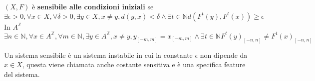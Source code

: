 \begin{definizione} 
    $(X,F)$ è \textbf{sensibile alle condizioni iniziali} se
    $$\exists \epsilon > 0,\forall x \in X, \forall \delta > 0, \exists y\in X,x \ne y, d(y,x) < \delta \land \exists t\in \mathbb{N} d(F^t(y),F^t(x))\ge \epsilon$$
    In $A^\mathbb{Z}$
    $$\exists n\in \mathbb{N} ,\forall x \in A^\mathbb{Z}, \forall m\in \mathbb{N} , \exists y\in A^\mathbb{Z},x \ne y, y_{[-m,m]} = x_{[-m,m]} \land \exists t\in \mathbb{N} F^t(y)_{[-n,n]}\ne F^t(x)_{[-n,n]}$$
\end{definizione} 
\begin{nota}
    Un sistema sensibile è un sistema instabile in cui la constante $\epsilon$
    non dipende da $x\in X$, questa viene chiamata anche costante sensitiva e 
    è una specifica feature del sistema.
\end{nota}
